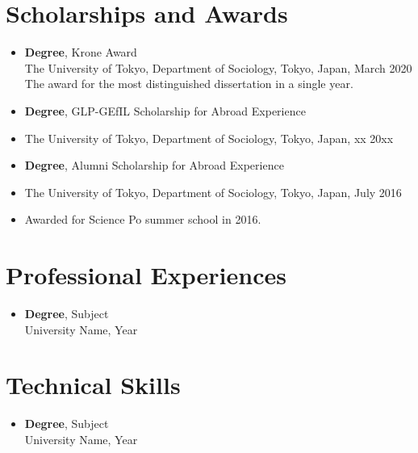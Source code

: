 \documentclass[11pt, a4paper]{article}
\begin{document}
\section*{Scholarships and Awards}
\begin{itemize}[leftmargin=*]
    \item \textbf{Degree}, Krone Award \\
    The University of Tokyo, Department of Sociology, Tokyo, Japan, March 2020 \\
    The award for the most distinguished dissertation in a single year.
    \item \textbf{Degree}, GLP-GEfIL Scholarship for Abroad Experience \\
    \item The University of Tokyo, Department of Sociology, Tokyo, Japan, xx 20xx \\
    \item \textbf{Degree}, Alumni Scholarship for Abroad Experience \\
    \item The University of Tokyo, Department of Sociology, Tokyo, Japan, July 2016 \\
    \item Awarded for Science Po summer school in 2016. \\
\end{itemize}

\section*{Professional Experiences}
\begin{itemize}[leftmargin=*]
    \item \textbf{Degree}, Subject \\
    University Name, Year
\end{itemize}

\section*{Technical Skills}
\begin{itemize}[leftmargin=*]
    \item \textbf{Degree}, Subject \\
    University Name, Year
\end{itemize}
\end{document}
